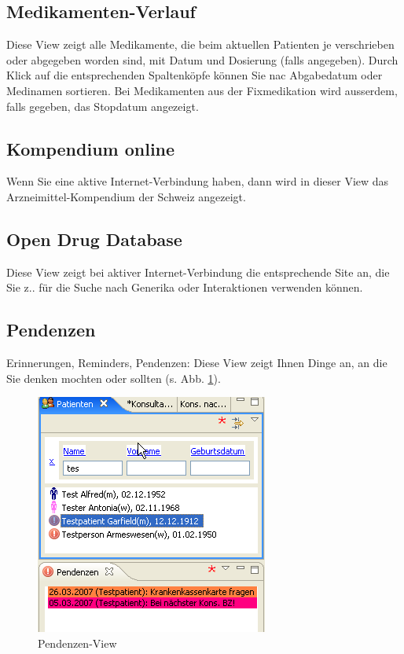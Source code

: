 \subsection{Medikamenten-Verlauf}
Diese View zeigt alle Medikamente, die beim aktuellen Patienten je verschrieben oder abgegeben worden sind, mit Datum und Dosierung (falls angegeben). Durch Klick auf die entsprechenden Spaltenköpfe können Sie nac Abgabedatum oder Medinamen sortieren. Bei Medikamenten aus der Fixmedikation wird ausserdem, falls gegeben, das Stopdatum angezeigt.

\subsection{Kompendium online}
Wenn Sie eine aktive Internet-Verbindung haben, dann wird in dieser View das
Arzneimit\-tel-Kom\-pen\-dium der Schweiz angezeigt.

\subsection{Open Drug Database}
Diese View zeigt bei aktiver Internet-Verbindung die entsprechende Site an, die Sie z.. für die Suche nach Generika oder Interaktionen verwenden können.

\subsection{Pendenzen}
Erinnerungen, Reminders, Pendenzen: Diese View zeigt Ihnen Dinge an, an die Sie
denken mochten oder sollten (s. Abb. \ref{fig:pendenzen}).
\begin{figure}[htp]
\begin{center}
  \includegraphics{images/pendenzenview}
  \caption{Pendenzen-View}
  \label{fig:pendenzen}
\end{center}
\end{figure}


